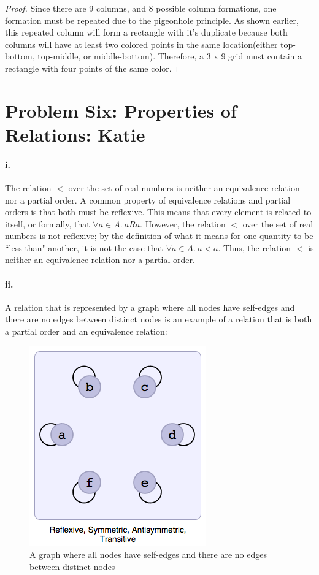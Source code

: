 \documentclass[10pt,letter]{article}
\begin{document}
\begin{proof}
Since there are 9 columns, and 8 possible column formations, one formation must be repeated due to the pigeonhole principle. As shown earlier, this repeated column will form a rectangle with it's duplicate because both columns will have at least two colored points in the same location(either top-bottom, top-middle, or middle-bottom). Therefore, a 3 x 9 grid must contain a rectangle with four points of the same color. 
\end{proof}

\pagebreak
\section*{Problem Six: Properties of Relations: Katie}

\paragraph{i.} The relation $<$ over the set of real numbers is neither an equivalence relation nor a partial order. A common property of equivalence relations and partial orders is that both must be reflexive. This means that every element is related to itself, or formally, that $\forall a \in A.\ aRa$. However, the relation $<$ over the set of real numbers is not reflexive; by the definition of what it means for one quantity to be ``less than" another, it is not the case that $\forall a \in A.\ a<a$. Thus, the relation $<$ is neither an equivalence relation nor a partial order. 

\paragraph{ii.} A relation that is represented by a graph where all nodes have self-edges and there are no edges between distinct nodes is an example of a relation that is both a partial order and an equivalence relation:

\begin{figure}[h]
\centering
  \includegraphics[width=0.45\linewidth]{hw4_6ii.png}
  \caption{A graph where all nodes have self-edges and there are no edges between distinct nodes}
  \label{fig:q6ii}
\end{figure}
\end{document}
